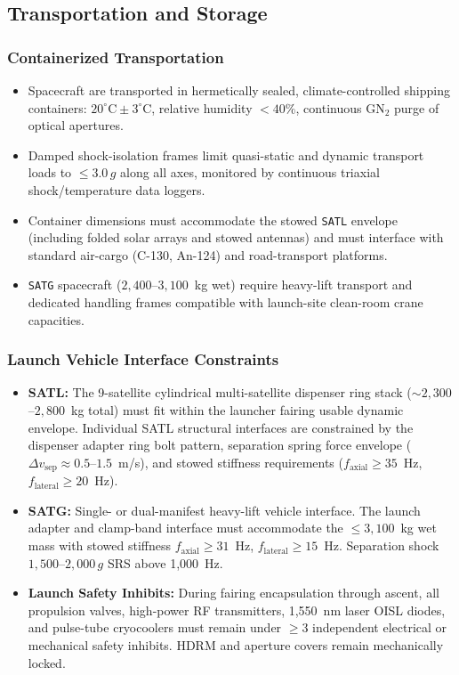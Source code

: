 \subsection{Transportation and Storage}
\label{sec:constraints_transport}

\subsubsection{Containerized Transportation}

\begin{itemize}
    \item Spacecraft are transported in hermetically sealed, climate-controlled shipping containers: $20^\circ\mathrm{C} \pm 3^\circ\mathrm{C}$, relative humidity $< 40\%$, continuous $\mathrm{GN_2}$ purge of optical apertures.
    \item Damped shock-isolation frames limit quasi-static and dynamic transport loads to $\le 3.0\,g$ along all axes, monitored by continuous triaxial shock/temperature data loggers.
    \item Container dimensions must accommodate the stowed \texttt{SATL} envelope (including folded solar arrays and stowed antennas) and must interface with standard air-cargo (C-130, An-124) and road-transport platforms.
    \item \texttt{SATG} spacecraft ($2{,}400$--$3{,}100$~kg wet) require heavy-lift transport and dedicated handling frames compatible with launch-site clean-room crane capacities.
\end{itemize}

\subsubsection{Launch Vehicle Interface Constraints}

\begin{itemize}
    \item \textbf{SATL:} The 9-satellite cylindrical multi-satellite dispenser ring stack (${\sim}2{,}300$--$2{,}800$~kg total) must fit within the launcher fairing usable dynamic envelope. Individual SATL structural interfaces are constrained by the dispenser adapter ring bolt pattern, separation spring force envelope ($\Delta v_{\text{sep}} \approx 0.5$--$1.5$~m/s), and stowed stiffness requirements ($f_{\text{axial}} \ge 35$~Hz, $f_{\text{lateral}} \ge 20$~Hz).
    \item \textbf{SATG:} Single- or dual-manifest heavy-lift vehicle interface. The launch adapter and clamp-band interface must accommodate the $\le 3{,}100$~kg wet mass with stowed stiffness $f_{\text{axial}} \ge 31$~Hz, $f_{\text{lateral}} \ge 15$~Hz. Separation shock $1{,}500$--$2{,}000\,g$ SRS above 1,000~Hz.
    \item \textbf{Launch Safety Inhibits:} During fairing encapsulation through ascent, all propulsion valves, high-power RF transmitters, 1,550~nm laser OISL diodes, and pulse-tube cryocoolers must remain under $\ge 3$ independent electrical or mechanical safety inhibits. HDRM and aperture covers remain mechanically locked.
\end{itemize}

